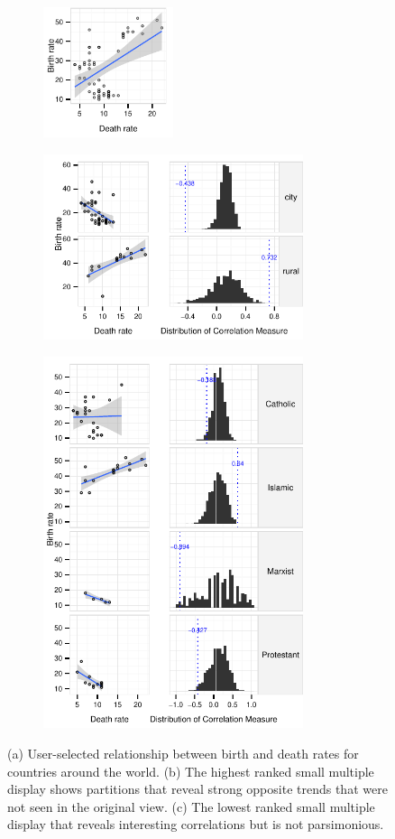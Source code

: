 \begin{figure}
 \centering 
	 \begin{subfigure}{1.5in}
		\includegraphics[width=1.5in]{images/DEATH_RT-BIRTH_RT.pdf}
		  \caption{}
		 \label{fig:informative_all}
	\end{subfigure}
	\begin{subfigure}{3in}
		\includegraphics[width=3in]{images/7_05653068514253-URBAN.pdf}
		 \label{fig:informative_sm}
		  \caption{}
	 \end{subfigure}
	\begin{subfigure}{3in}
		\includegraphics[width=3in]{images/2_56911395752061-LEADER.pdf}
		  \caption{}
		 \label{fig:informative_sm_big}
	 \end{subfigure}
	  \caption{(a) User-selected relationship between birth and death rates for countries around the world. (b) The highest ranked small multiple display shows partitions that reveal strong opposite trends that were not seen in the original view. (c) The lowest ranked small multiple display that reveals interesting correlations but is not parsimonious.}
\end{figure}

